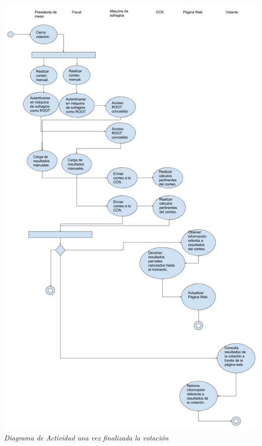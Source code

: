 \documentclass[spanish, 10pt,a4paper]{article}
\numberwithin{equation}{section} %
\begin{document}
\vspace{\baselineskip}
    \begin{center}
                \includegraphics[scale=0.30]{imagenes/actividad/CierredeVotacionyConteodeVotos.jpg}
                \\
                \vspace{1pt}
                \footnotesize\textit{Diagrama de Actividad una vez finalizada la votación}
        \end{center}
\vspace{\baselineskip}
\end{document}
